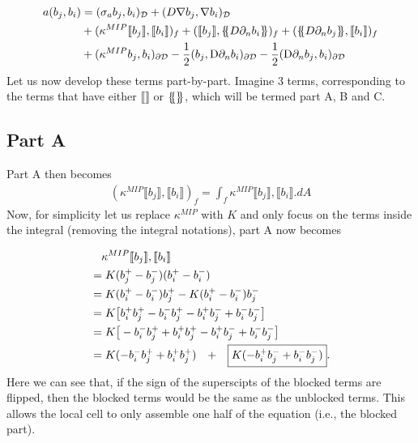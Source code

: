 \documentclass[11pt,letterpaper,titlepage]{article}
\newcommand*{\ldblbrace}{\{\mskip-5mu\{}
\newcommand*{\rdblbrace}{\}\mskip-5mu\}}
\numberwithin{equation}{section}
\begin{document}
\begin{equation*}
\begin{aligned}
a(b_j,b_i) &= 
(\sigma_a b_j, b_i)_{\mathcal{D}} + 
(D\nabla b_j,\nabla b_i)_{\mathcal{D}} \\
&+ 
(\kappa^{MIP} \llbracket b_j \rrbracket,\llbracket b_i \rrbracket)_f +
(\llbracket b_j \rrbracket,\ldblbrace D \partial_n b_i \rdblbrace)_f +
(\ldblbrace D \partial_n b_j \rdblbrace,\llbracket b_i \rrbracket)_f \\
&+
(\kappa^{M I P} b_j, b_{i})_{\partial \mathcal{D}} -
\frac{1}{2}(b_j, \mathrm{D} \partial_{n} b_{i})_{\partial \mathcal{D}}-
\frac{1}{2}(\mathrm{D} \partial_{n} b_j, b_{i})_{\partial \mathcal{D}}
\end{aligned}
\end{equation*}
\newline 
Let us now develop these terms part-by-part. Imagine 3 terms, corresponding to the terms that have
either $\llbracket \rrbracket$ or $\ldblbrace \rdblbrace$, which will be termed part A, B and C.

\newpage
\subsection{Part A}
Part A then becomes
\begin{equation*}
\begin{aligned}
(\kappa^{MIP} \llbracket b_j \rrbracket,\llbracket b_i \rrbracket)_f = 
\int_f \kappa^{MIP} \llbracket b_j \rrbracket,\llbracket b_i \rrbracket .dA
\end{aligned}
\end{equation*}
Now, for simplicity let us replace $\kappa^{MIP}$ with $K$ and only focus on the terms inside
the integral (removing the integral notations), part A now becomes

\begin{equation}
\begin{aligned}
&\quad \kappa^{MIP} \llbracket b_j \rrbracket,\llbracket b_i \rrbracket \\ 
&= K (b_j^+ - b_j^-)(b_i^+ - b_i^-) \\
&= K (b_i^+ - b_i^-) b_j^+ - K (b_i^+ - b_i^-) b_j^-  \\
&= K \bigr[ b_i^+b_j^+ - b_i^-b_j^+ - b_i^+b_j^- + b_i^-b_j^- \bigr] \\
&= K \bigr[ - b_i^-b_j^+ + b_i^+b_j^+  - b_i^+b_j^- + b_i^-b_j^- \bigr] \\
&= K( - b_i^-b_j^+ + b_i^+b_j^+) \quad + \Aboxed{K(- b_i^+b_j^- + b_i^-b_j^-)}.
\end{aligned}
\end{equation}
\newline
Here we can see that, if the sign of the superscipts of the blocked terms are flipped, then the blocked terms would be the same as the unblocked terms. This allows the local cell to only assemble one half of the equation (i.e., the blocked part).
\end{document}
